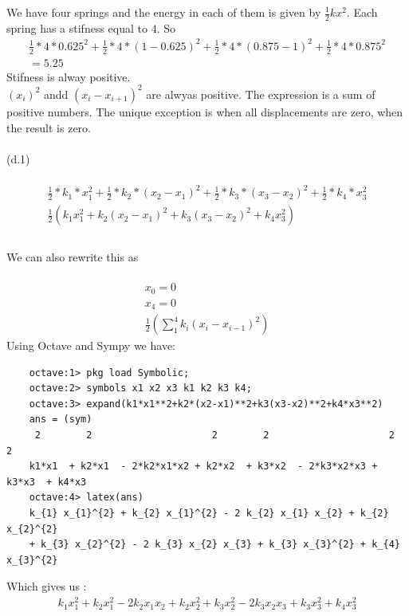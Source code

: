 \documentclass{article}
\begin{document}
	We have four springs and the energy in each of them is given by $\frac{1}{2}kx^2$. Each spring has a stifness equal to $4$. So\\
	\begin{align*}
		\frac{1}{2}*4*0.625^2 + \frac{1}{2}*4*(1-0.625)^2+\frac{1}{2}*4*(0.875-1)^2+\frac{1}{2}*4*0.875^2\\
		= 5.25
	\end{align*}
	Stifness is alway positive.\\
	$(x_i)^2$ andd $(x_i - x_{i+1})^2$ are alwyas positive.
	The expression is a sum of positive numbers. The unique exception is when all displacements are zero, when the result is zero.\\
	\\
	(d.1)\\
	\\
	\begin{align*}
		\frac{1}{2}*k_1*x_1^2 + \frac{1}{2}*k_2*(x_2-x_1)^2+\frac{1}{2}*k_3*(x_3-x_2)^2+\frac{1}{2}*k_4*x_3^2\\
		\frac{1}{2}(k_1x_1^2+k_2(x_2-x_1)^2+k_3(x_3-x_2)^2+k_4x_3^2)\\	
	\end{align*}
		\\
	We can also rewrite this as\\
	\\
	\begin{align*}
	x_0 = 0\\
	x_4 = 0\\
	\frac{1}{2}(\sum_{1}^{4}{k_i(x_i-x_{i-1})^2})
	\end{align*}
	Using Octave and Sympy we have:\\
	\begin{verbatim}
	octave:1> pkg load Symbolic;
	octave:2> symbols x1 x2 x3 k1 k2 k3 k4;
	octave:3> expand(k1*x1**2+k2*(x2-x1)**2+k3(x3-x2)**2+k4*x3**2)
	ans = (sym)
     2        2                     2        2                     2        2
	k1*x1  + k2*x1  - 2*k2*x1*x2 + k2*x2  + k3*x2  - 2*k3*x2*x3 + k3*x3  + k4*x3
	octave:4> latex(ans)
	k_{1} x_{1}^{2} + k_{2} x_{1}^{2} - 2 k_{2} x_{1} x_{2} + k_{2} x_{2}^{2} 
	+ k_{3} x_{2}^{2} - 2 k_{3} x_{2} x_{3} + k_{3} x_{3}^{2} + k_{4} x_{3}^{2}
	\end{verbatim}
	Which gives us :\\
	\begin{align*}
	k_{1} x_{1}^{2} + k_{2} x_{1}^{2} - 2 k_{2} x_{1} x_{2} + k_{2} x_{2}^{2} + k_{3} x_{2}^{2} - 2 k_{3} x_{2} x_{3} + k_{3} x_{3}^{2} + k_{4} x_{3}^{2}
	\end{align*}
\end{document}
